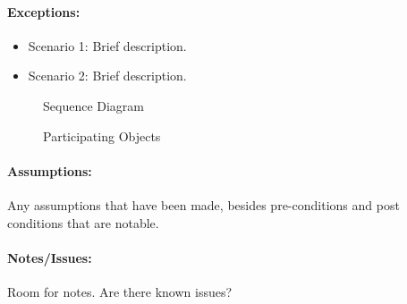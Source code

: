 \paragraph{Exceptions:}
\begin{itemize}
	\item Scenario 1: Brief description.
	\item Scenario 2: Brief description.
\end{itemize}


\begin{figure} [htb]
	\centering
	\caption{Sequence Diagram}
	\label{fig:sequence template}
\end{figure}




\begin{figure} [h]
	\centering
	\caption{Participating Objects}
	\label{fig:objects template}
\end{figure}



\paragraph{Assumptions:}
Any assumptions that have been made, besides pre-conditions and post conditions that are notable.


\paragraph{Notes/Issues:}
Room for notes. Are there known issues?



